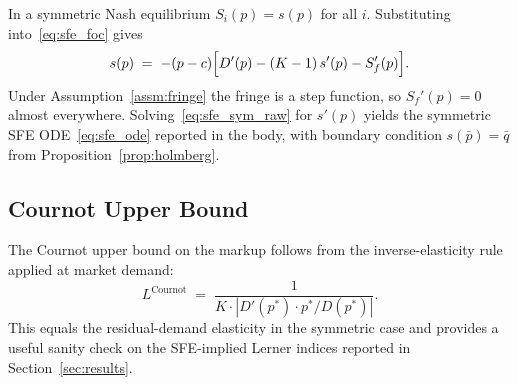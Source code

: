 In a symmetric Nash equilibrium $S_i(p) = s(p)$ for all $i$. Substituting
into~\eqref{eq:sfe_foc} gives
\begin{equation}
  s(p) \;=\; -(p - c)
  \Bigl[D'(p) - (K-1)\,s'(p) - S_f'(p)\Bigr].
  \label{eq:sfe_sym_raw}
\end{equation}
Under Assumption~\ref{assm:fringe} the fringe is a step function, so
$S_f'(p) = 0$ almost everywhere. Solving~\eqref{eq:sfe_sym_raw} for
$s'(p)$ yields the symmetric SFE ODE~\eqref{eq:sfe_ode} reported in the
body, with boundary condition $s(\bar{p}) = \bar{q}$ from
Proposition~\ref{prop:holmberg}.

\subsection{Cournot Upper Bound}
\label{app:cournot}

The Cournot upper bound on the markup follows from the inverse-elasticity
rule applied at market demand:
\begin{equation}
  L^{\text{Cournot}} \;=\; \frac{1}{K \cdot |D'(p^*) \cdot p^* / D(p^*)|}.
  \label{eq:cournot_bound}
\end{equation}
This equals the residual-demand elasticity in the symmetric case and
provides a useful sanity check on the SFE-implied Lerner indices reported
in Section~\ref{sec:results}.
